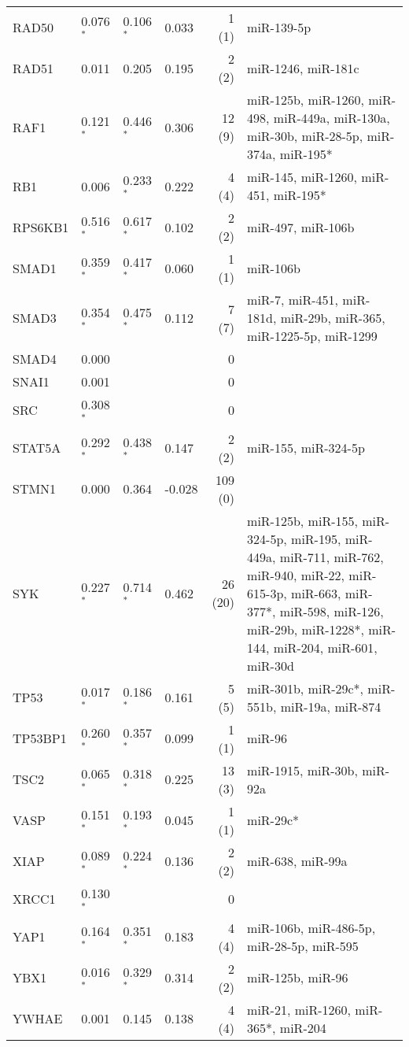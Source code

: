{{\begin{longtable}{llllrp{7cm}}
RAD50&0.076$^{\ast}$&0.106$^{\ast}$&0.033&1 (1)&\raggedright{miR-139-5p} \tabularnewline{}%
RAD51&0.011&0.205&0.195&2 (2)&\raggedright{miR-1246, miR-181c} \tabularnewline\rowcolor[rgb]{0.96,0.96,0.96}{}%
RAF1&0.121$^{\ast}$&0.446$^{\ast}$&0.306&12 (9)&\raggedright{miR-125b, miR-1260, miR-498, miR-449a, miR-130a, miR-30b, miR-28-5p, miR-374a, miR-195*} \tabularnewline{}%
RB1&0.006&0.233$^{\ast}$&0.222&4 (4)&\raggedright{miR-145, miR-1260, miR-451, miR-195*} \tabularnewline\rowcolor[rgb]{0.96,0.96,0.96}{}%
RPS6KB1&0.516$^{\ast}$&0.617$^{\ast}$&0.102&2 (2)&\raggedright{miR-497, miR-106b} \tabularnewline{}%
SMAD1&0.359$^{\ast}$&0.417$^{\ast}$&0.060&1 (1)&\raggedright{miR-106b} \tabularnewline\rowcolor[rgb]{0.96,0.96,0.96}{}%
SMAD3&0.354$^{\ast}$&0.475$^{\ast}$&0.112&7 (7)&\raggedright{miR-7, miR-451, miR-181d, miR-29b, miR-365, miR-1225-5p, miR-1299} \tabularnewline{}%
SMAD4&0.000&&&0&\raggedright{} \tabularnewline\rowcolor[rgb]{0.96,0.96,0.96}{}%
SNAI1&0.001&&&0&\raggedright{} \tabularnewline{}%
SRC&0.308$^{\ast}$&&&0&\raggedright{} \tabularnewline\rowcolor[rgb]{0.96,0.96,0.96}{}%
STAT5A&0.292$^{\ast}$&0.438$^{\ast}$&0.147&2 (2)&\raggedright{miR-155, miR-324-5p} \tabularnewline{}%
STMN1&0.000&0.364&-0.028&109 (0)&\raggedright{} \tabularnewline\rowcolor[rgb]{0.96,0.96,0.96}{}%
SYK&0.227$^{\ast}$&0.714$^{\ast}$&0.462&26 (20)&\raggedright{miR-125b, miR-155, miR-324-5p, miR-195, miR-449a, miR-711, miR-762, miR-940, miR-22, miR-615-3p, miR-663, miR-377*, miR-598, miR-126, miR-29b, miR-1228*, miR-144, miR-204, miR-601, miR-30d} \tabularnewline{}%
TP53&0.017$^{\ast}$&0.186$^{\ast}$&0.161&5 (5)&\raggedright{miR-301b, miR-29c*, miR-551b, miR-19a, miR-874} \tabularnewline\rowcolor[rgb]{0.96,0.96,0.96}{}%
TP53BP1&0.260$^{\ast}$&0.357$^{\ast}$&0.099&1 (1)&\raggedright{miR-96} \tabularnewline{}%
TSC2&0.065$^{\ast}$&0.318$^{\ast}$&0.225&13 (3)&\raggedright{miR-1915, miR-30b, miR-92a} \tabularnewline\rowcolor[rgb]{0.96,0.96,0.96}{}%
VASP&0.151$^{\ast}$&0.193$^{\ast}$&0.045&1 (1)&\raggedright{miR-29c*} \tabularnewline{}%
XIAP&0.089$^{\ast}$&0.224$^{\ast}$&0.136&2 (2)&\raggedright{miR-638, miR-99a} \tabularnewline\rowcolor[rgb]{0.96,0.96,0.96}{}%
XRCC1&0.130$^{\ast}$&&&0&\raggedright{} \tabularnewline{}%
YAP1&0.164$^{\ast}$&0.351$^{\ast}$&0.183&4 (4)&\raggedright{miR-106b, miR-486-5p, miR-28-5p, miR-595} \tabularnewline\rowcolor[rgb]{0.96,0.96,0.96}{}%
YBX1&0.016$^{\ast}$&0.329$^{\ast}$&0.314&2 (2)&\raggedright{miR-125b, miR-96} \tabularnewline{}%
YWHAE&0.001&0.145&0.138&4 (4)&\raggedright{miR-21, miR-1260, miR-365*, miR-204}%
\end{longtable}}
} %
